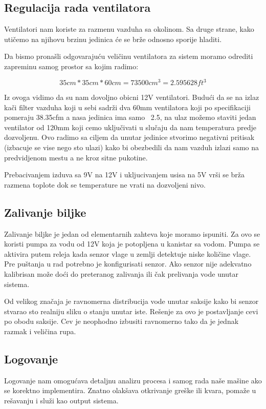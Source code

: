 \documentclass[a4paper,11pt]{book}
\begin{document}
\subsection{Regulacija rada ventilatora}
Ventilatori nam koriste za razmenu vazduha sa okolinom. Sa druge strane, kako utičemo na njihovu brzinu jedinica će se brže odnosno sporije hladiti.

Da bismo pronašli odgovarajuću veličinu ventilatora za sistem moramo odrediti zapreminu samog prostor sa kojim radimo:

\[ 35cm * 35cm * 60cm =  73500cm^3 = 2.595628ft^3\]

Iz ovoga vidimo da su nam dovoljno obicni 12V ventilatori. Budući da se na izlaz kači filter vazduha koji u sebi sadrži dva 60mm ventilatora koji po specifikaciji pomeraju 38.35cfm a nasa jedinica ima samo ~2.5, na ulaz možemo staviti jedan ventilator od 120mm koji cemo uključivati u slučaju da nam temperatura predje dozvoljenu. Ovo radimo sa ciljem da unutar jedinice stvorimo negativni pritisak (izbacuje se vise nego sto ulazi) kako bi obezbedili da nam vazduh izlazi samo na predvidjenom mestu a ne kroz sitne pukotine.

\noindent Prebacivanjem izduva sa 9V na 12V i ukljucivanjem usisa na 5V vrši se brža razmena toplote dok se temperature ne vrati na dozvoljeni nivo. 

\subsection{Zalivanje biljke}
Zalivanje biljke je jedan od elementarnih zahteva koje moramo ispuniti. Za ovo se koristi pumpa za vodu od 12V koja je potopljena u kanistar sa vodom. Pumpa se aktivira putem releja kada senzor vlage u zemlji detektuje niske količine vlage. Pre puštanja u rad potrebno je konfigurisati senzor. Ako senzor nije adekvatno kalibrisan može doći do preteranog zalivanja ili čak prelivanja vode unutar sistema.

\noindent Od velikog značaja je ravnomerna distribucija vode unutar saksije kako bi senzor stvarao sto realniju sliku o stanju unutar iste. Rešenje za ovo je postavljanje cevi po obodu saksije. Cev je neophodno izbusiti ravnomerno tako da je jednak razmak i veličina rupa.



\subsection{Logovanje}
Logovanje nam omogućava detaljnu analizu procesa i samog rada naše mašine ako se korektno implementira. Znatno olakšava otkrivanje greške ili kvara, pomaže u rešavanju i služi kao output sistema. 
\end{document}
